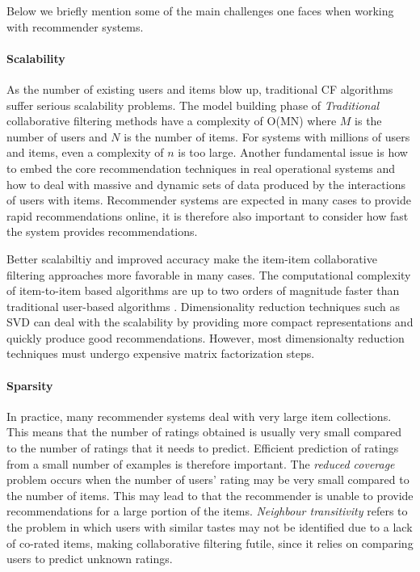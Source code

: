 Below we briefly mention some of the main challenges one faces when working
with recommender systems.

\paragraph{Scalability}

As the number of existing users and items blow up, traditional CF algorithms
suffer serious scalability problems. The model building phase of \emph{Traditional}
collaborative filtering methods have a complexity of O(MN) where $M$ is the number
of users and $N$ is the number of items. For systems with millions of users and items,
even a complexity of $n$ is too large. Another fundamental issue is how to embed the
core recommendation techniques in real operational systems and how to deal with massive
and dynamic sets of data produced by the interactions of users with items. Recommender
systems are expected in many cases to provide rapid recommendations online, it is
therefore also important to consider how fast the system provides recommendations.

Better scalabiltiy and improved accuracy make the item-item collaborative filtering
approaches more favorable in many cases. The computational complexity of item-to-item
based algorithms are up to two orders of magnitude faster than traditional user-based
algorithms \cite{Deshpande2004}. Dimensionality reduction techniques such as
SVD can deal with the scalability by providing more compact representations and
quickly produce good recommendations. However, most dimensionalty reduction
techniques must undergo expensive matrix factorization steps.

\paragraph{Sparsity}

In practice, many recommender systems deal with very large item collections.
This means that the number of ratings obtained is usually very small compared to the
number of ratings that it needs to predict. Efficient prediction of ratings from a small
number of examples is therefore important. The \emph{reduced coverage} problem
occurs when the number of users' rating may be very small compared to the number of items.
This may lead to that the recommender is unable to provide recommendations for a large
portion of the items. \emph{Neighbour transitivity} refers to the problem in which users
with similar tastes may not be identified due to a lack of co-rated items, making
collaborative filtering futile, since it relies on comparing users to predict unknown ratings.

